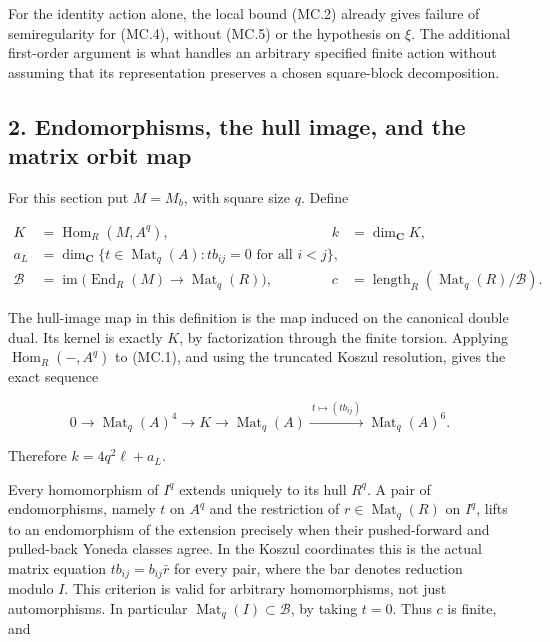 For the identity action alone, the local bound (MC.2) already gives
failure of semiregularity for (MC.4), without (MC.5) or the hypothesis
on \(\xi\). The additional first-order argument is what handles an
arbitrary specified finite action without assuming that its
representation preserves a chosen square-block decomposition.

\subsection{2. Endomorphisms, the hull image, and the matrix orbit map}\label{SF-E848:s2}

For this section put \(M=M_b\), with square size \(q\). Define

\[
 \begin{split}
 K&=\operatorname{Hom}_R(M,A^q),& k&=\dim_{\mathbf C}K,\\
 a_L&=\dim_{\mathbf C}\{t\in\operatorname{Mat}_q(A):
                         t b_{ij}=0\text{ for all }i<j\},\\
 \mathcal B&=\operatorname{im}\bigl(
       \operatorname{End}_R(M)\longrightarrow\operatorname{Mat}_q(R)
                                      \bigr),&
 c&=\operatorname{length}_R(\operatorname{Mat}_q(R)/\mathcal B).
 \end{split}
 \tag{MC.6}
\]

The hull-image map in this definition is the map induced on the
canonical double dual. Its kernel is exactly \(K\), by factorization
through the finite torsion. Applying \(\operatorname{Hom}_R(-,A^q)\)
to (MC.1), and using the truncated Koszul resolution, gives the exact
sequence

\[
 0\longrightarrow\operatorname{Mat}_q(A)^4
    \longrightarrow K\longrightarrow\operatorname{Mat}_q(A)
       \xrightarrow{\ t\mapsto (t b_{ij})\ }
                     \operatorname{Mat}_q(A)^6.
 \tag{MC.7}
\]

Therefore \(k=4q^2\ell+a_L\).

Every homomorphism of \(I^q\) extends uniquely to its hull \(R^q\).
A pair of endomorphisms, namely \(t\) on \(A^q\) and the restriction
of \(r\in\operatorname{Mat}_q(R)\) on \(I^q\), lifts to an
endomorphism of the extension precisely when their pushed-forward and
pulled-back Yoneda classes agree. In the Koszul coordinates this is
the actual matrix equation \(t b_{ij}=b_{ij}\bar r\) for every pair,
where the bar denotes reduction modulo \(I\). This criterion is valid
for arbitrary homomorphisms, not just automorphisms. In particular
\(\operatorname{Mat}_q(I)\subset\mathcal B\), by taking \(t=0\).
Thus \(c\) is finite, and

